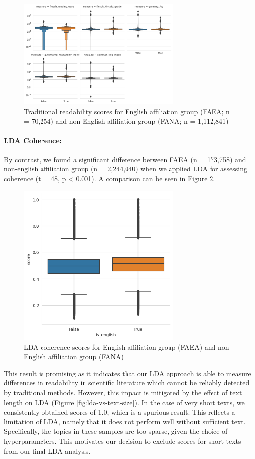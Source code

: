 \documentclass[11pt,a4paper]{article}
\begin{document}
\begin{figure}
    \centering
    \includegraphics[width=8cm]{images/pmc.textstat.eng.boxplot.png}
    \caption{Traditional readability scores for English affiliation group (FAEA; n = 70,254)  and non-English affiliation group (FANA; n = 1,112,841)}
    \label{fig:readability-scores}
\end{figure}

\paragraph{LDA Coherence:}  By contrast, we found a significant difference between FAEA (n = 173,758) and non-english affiliation group (n = 2,244,040) when we applied LDA for assessing coherence (t = 48, p < 0.001). A comparison can be seen in Figure \ref{fig:lda-scores}. 

\begin{figure}
    \centering
    \includegraphics[width=8cm]{images/pmc.lda_coherence.score.boxplot.png}
    \caption{LDA coherence scores for English affiliation group (FAEA)  and non-English affiliation group (FANA)}
    \label{fig:lda-scores}
\end{figure}

This result is promising as it indicates that our LDA approach is able to measure differences in readability in scientific literature which cannot be reliably detected by traditional methods. However, this impact is mitigated by the effect of text length on LDA (Figure \ref{fig:lda-vs-text-size}). In the case of very short texts, we consistently obtained scores of 1.0, which is a spurious result. This reflects a limitation of LDA, namely that it does not perform well without sufficient text. Specifically, the topics in these samples are too sparse, given the choice of hyperparameters. This motivates our decision to exclude scores for short texts from our final LDA analysis.
\end{document}
